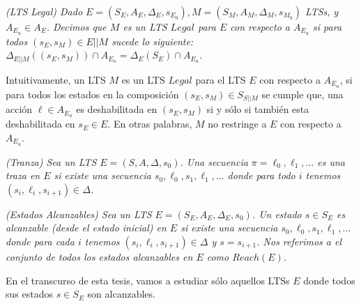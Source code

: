 \begin{nahaDef}
    \emph{(LTS Legal) Dado $E = (S_E, A_E, \Delta_E, s_{E_0}), M = (S_M, A_M, \Delta_M, s_{M_0})$ LTSs, y $A_{E_u} \in
    A_E$. Decimos que $M$ es un LTS $Legal$ para $E$ con respecto a $A_{E_u}$ si para todos $(s_E,s_M) \in E||M$ sucede
    lo siguiente: $\Delta_{E||M}((s_E,s_M)) \cap A_{E_u} = \Delta_E(S_E) \cap A_{E_u}$.}
\end{nahaDef} 

Intuitivamente, un LTS $M$ es un LTS $Legal$ para el LTS $E$ con respecto a $A_{E_u}$, si para todos los estados en la
composición $(s_E,s_M) \in S_{S||M}$ se cumple que, una acción $\ell \in A_{E_u}$ es deshabilitada en $(s_E,s_M)$ si y sólo
si también esta deshabilitada en $s_E \in E$. En otras palabras, $M$ no restringe a $E$ con respecto a $A_{E_u}$.


\begin{nahaDef}
    \emph{(Tranza) Sea un LTS $E = (S,A,\Delta,s_0)$. Una secuencia $\pi = \ell_0,\ell_1,...$ es una traza en $E$ si existe una
    secuencia $s_0,\ell_0,s_1,\ell_1,...$ donde para todo $i$ tenemos $(s_i,\ell_i,s_{i+1}) \in \Delta$.}
\end{nahaDef} 


\begin{nahaDef}
    \emph{(Estados Alcanzables) Sea un LTS $E = (S_E, A_E, \Delta_E, s_0)$. Un estado $s \in S_E$ es alcanzable (desde
    el estado inicial) en $E$ si existe una secuencia $s_0,\ell_0,s_1,\ell_1,...$ donde para cada $i$ tenemos
    $(s_i,\ell_i,s_{i+1}) \in \Delta$ y $s = s_{i+1}$. Nos referimos a el conjunto de todos los estados alcanzables en $E$
    como $Reach(E)$.}
\end{nahaDef} 

En el transcurso de esta tesis, vamos a estudiar sólo aquellos LTSs $E$ donde todos sus estados $s \in S_E$ son
alcanzables.
